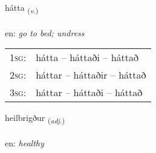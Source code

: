 \documentclass[frontgrid, backgrid]{flacards}\usepackage[]{graphicx}\usepackage[]{xcolor}
\begin{document}
\renewcommand{\flhead}{\vskip5pt \fboxsep=0pt {\small\bfseries\footnotesize Sagnorð | Verb}}
\renewcommand{\fcfoot}{\vskip5pt \fboxsep=0pt \hspace{2pt}{\small\bfseries\footnotesize 3K}}

\renewcommand{\blhead}{\vskip5pt {\small\bfseries\footnotesize Sagnorð | Verb }}
\renewcommand{\bcfoot}{\vskip5pt \hspace{2pt}{\small\bfseries\footnotesize 3K}}


{hátta \small{\textsubscript{(\textit{v.})}} \\[1ex] %
\textphonetic{[hauhta]} \\
en: \emph{go to bed; undress} \\  [2ex]
\renewcommand*{\arraystretch}{0.8}
\begin{tabular}{p{1cm}l}
\textsc{1sg}: & hátta -- háttaði -- háttað \\ 
\textsc{2sg}: & háttar -- háttaðir -- háttað \\ 
\textsc{3sg}: & háttar -- háttaði -- háttað \\ 
\end{tabular}
}

\renewcommand{\flhead}{\vskip5pt \fboxsep=0pt {\small\bfseries\footnotesize Lýsingarorð | Adjective}}
\renewcommand{\fcfoot}{\vskip5pt \fboxsep=0pt \hspace{2pt}{\small\bfseries\footnotesize 3K}}

\renewcommand{\blhead}{\vskip5pt {\small\bfseries\footnotesize Lýsingarorð | Adjective }}
\renewcommand{\bcfoot}{\vskip5pt \hspace{2pt}{\small\bfseries\footnotesize 3K}}


{heilbrigður \small{\textsubscript{(\textit{adj.})}} \\[1ex] %
\textphonetic{[heilprɪɣðʏr]} \\
en: \emph{healthy} \\  [2ex]
\renewcommand*{\arraystretch}{0.8}
}
\end{document}

